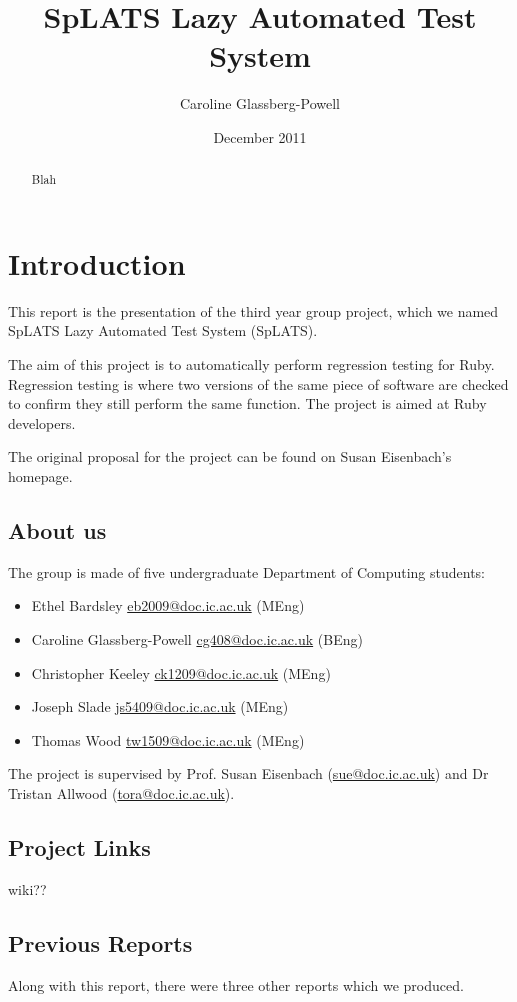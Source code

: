 \documentclass{report}
\makeatletter
\newcommand{\mail}[1]{\href{mailto:#1@doc.ic.ac.uk}{#1@doc.ic.ac.uk}}
\makeatother
\begin{document}
\title{SpLATS Lazy Automated Test System}
\author{Caroline Glassberg-Powell}
\date{December 2011}
\maketitle

\begin{abstract}
Blah
\end{abstract}

\chapter{Introduction}
This report is the presentation of the third year group project, which we named SpLATS Lazy Automated Test System (SpLATS).

The aim of this project is to automatically perform regression testing for Ruby. Regression testing is where two versions of the same piece of software are checked to confirm they still perform the same function. The project is aimed at Ruby developers.

The original proposal for the project can be found on Susan Eisenbach's homepage.

\section{About us}
The group is made of five undergraduate Department of Computing students:
\begin{itemize}
\item{Ethel Bardsley \mail{eb2009} (MEng)}
\item{Caroline Glassberg-Powell \mail{cg408} (BEng)}
\item{Christopher Keeley \mail{ck1209} (MEng)}
\item{Joseph Slade \mail{js5409} (MEng)}
\item{Thomas Wood \mail{tw1509} (MEng)}
\end{itemize}

The project is supervised by Prof. Susan Eisenbach (\mail{sue}) and Dr Tristan Allwood (\mail{tora}).

\section{Project Links}
wiki??

\section{Previous Reports}
Along with this report, there were three other reports which we produced.
\end{document}
